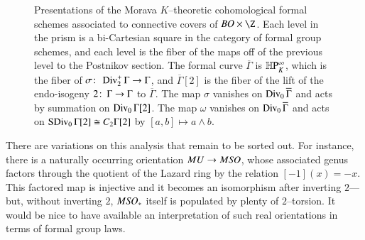 \begin{figure}
\begin{center}
\end{center}
\caption{Presentations of the Morava $K$--theoretic cohomological formal schemes associated to connective covers of $BO \times \Z$.  Each level in the prism is a bi-Cartesian square in the category of formal group schemes, and each level is the fiber of the maps off of the previous level to the Postnikov section.  The formal curve $\overline \Gamma$ is $\mathbb H\mathrm P^\infty_K$, which is the fiber of $\sigma\colon\thinspace \operatorname{Div}_2^+ \Gamma \to \Gamma$, and $\overline \Gamma[2]$ is the fiber of the lift of the endo-isogeny $2\colon\thinspace \Gamma \to \Gamma$ to $\overline \Gamma$.  The map $\sigma$ vanishes on $\operatorname{Div}_0 \overline \Gamma$ and acts by summation on $\operatorname{Div}_0 \Gamma[2]$.  The map $\omega$ vanishes on $\operatorname{Div}_0 \overline \Gamma$ and acts on $\operatorname{SDiv}_0 \Gamma[2] \cong C_2 \Gamma[2]$ by $[a, b] \mapsto a \wedge b$.}\label{MoravaKthyOfBO}
\end{figure}

\begin{remark}
There are variations on this analysis that remain to be sorted out.  For instance, there is a naturally occurring orientation $MU \to M\mathit{SO}$, whose associated genus factors through the quotient of the Lazard ring by the relation $[-1](x) = -x$.  This factored map is injective and it becomes an isomorphism after inverting $2$---but, without inverting $2$, $M\mathit{SO}_*$ itself is populated by plenty of $2$--torsion.  It would be nice to have available an interpretation of such real orientations in terms of formal group laws.
\end{remark}

